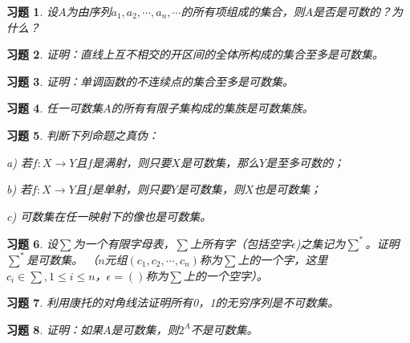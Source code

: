 \documentclass{article}
\begin{document}
\begin{CJK}{UTF8}{gbsn}
\newtheorem{Exercise}{习题}
\begin{Exercise}
设$A$为由序列$a_1,a_2,\cdots,a_n,\cdots$的所有项组成的集合，则$A$是否是可数的？为什么？
\end{Exercise}
\vspace{3cm}
\begin{Exercise}
  证明：直线上互不相交的开区间的全体所构成的集合至多是可数集。
\end{Exercise}
\vspace{3cm}
\begin{Exercise}
  证明：单调函数的不连续点的集合至多是可数集。
\end{Exercise}
\vspace{12cm}
\begin{Exercise}
  任一可数集$A$的所有有限子集构成的集族是可数集族。
\end{Exercise}
\vspace{10cm}
\begin{Exercise}
  判断下列命题之真伪：

 a) 若$f:X\to Y$且$f$是满射，则只要$X$是可数集，那么$Y$是至多可数的；

 b) 若$f:X\to Y$且$f$是单射，则只要$Y$是可数集，则$X$也是可数集；

 c) 可数集在任一映射下的像也是可数集。
\end{Exercise}
\vspace{10cm}
\begin{Exercise}
  设$\sum$为一个有限字母表，$\sum$上所有字（包括空字$\epsilon$)之集记为$\sum^*$。证明$\sum^*$是可数集。
  （$n$元组$(c_1,c_2,\cdots,c_n)$称为$\sum$上的一个字，这里$c_i\in \sum, 1\leq i\leq n$，$\epsilon=()$称为$\sum$上的一个空字）。
\end{Exercise}
\vspace{10cm}
\begin{Exercise}
  利用康托的对角线法证明所有0，1的无穷序列是不可数集。
\end{Exercise}
\vspace{5cm}
\begin{Exercise}
  证明：如果$A$是可数集，则$2^A$不是可数集。
\end{Exercise}
\end{CJK}
\end{document}
